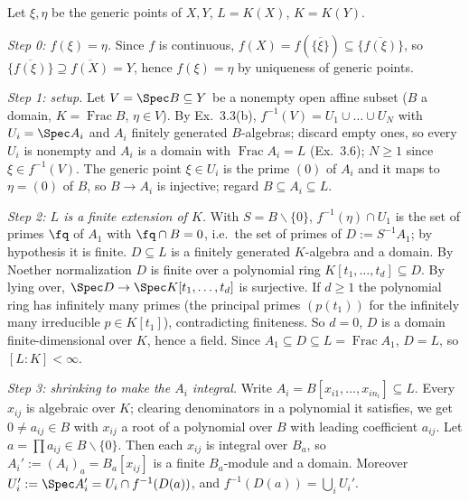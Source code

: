 \documentclass[11pt]{article}
\begin{document}
\pf
Let $\xi,\eta$ be the generic points of $X,Y$, $L=K(X)$, $K=K(Y)$.

\emph{Step 0: $f(\xi)=\eta$.} Since $f$ is continuous, $f(X)=f(\overline{\{\xi\}})\subseteq\overline{\{f(\xi)\}}$, so $\overline{\{f(\xi)\}}\supseteq\overline{f(X)}=Y$, hence $f(\xi)=\eta$ by uniqueness of generic points.

\emph{Step 1: setup.} Let $V=\Spec B\subseteq Y$ be a nonempty open affine subset ($B$ a domain, $K=\operatorname{Frac}B$, $\eta\in V$). By Ex.~3.3(b), $f^{-1}(V)=U_1\cup\dots\cup U_N$ with $U_i=\Spec A_i$ and $A_i$ finitely generated $B$-algebras; discard empty ones, so every $U_i$ is nonempty and $A_i$ is a domain with $\operatorname{Frac}A_i=L$ (Ex.~3.6); $N\ge1$ since $\xi\in f^{-1}(V)$. The generic point $\xi\in U_i$ is the prime $(0)$ of $A_i$ and it maps to $\eta=(0)$ of $B$, so $B\to A_i$ is injective; regard $B\subseteq A_i\subseteq L$.

\emph{Step 2: $L$ is a finite extension of $K$.} With $S=B\smallsetminus\{0\}$, $f^{-1}(\eta)\cap U_1$ is the set of primes $\fq$ of $A_1$ with $\fq\cap B=0$, i.e.\ the set of primes of $D:=S^{-1}A_1$; by hypothesis it is finite. $D\subseteq L$ is a finitely generated $K$-algebra and a domain. By Noether normalization $D$ is finite over a polynomial ring $K[t_1,\dots,t_d]\subseteq D$. By lying over, $\Spec D\to\Spec K[t_1,\dots,t_d]$ is surjective. If $d\ge1$ the polynomial ring has infinitely many primes (the principal primes $(p(t_1))$ for the infinitely many irreducible $p\in K[t_1]$), contradicting finiteness. So $d=0$, $D$ is a domain finite-dimensional over $K$, hence a field. Since $A_1\subseteq D\subseteq L=\operatorname{Frac}A_1$, $D=L$, so $[L:K]<\infty$.

\emph{Step 3: shrinking to make the $A_i$ integral.} Write $A_i=B[x_{i1},\dots,x_{in_i}]\subseteq L$. Every $x_{ij}$ is algebraic over $K$; clearing denominators in a polynomial it satisfies, we get $0\ne a_{ij}\in B$ with $x_{ij}$ a root of a polynomial over $B$ with leading coefficient $a_{ij}$. Let $a=\prod a_{ij}\in B\smallsetminus\{0\}$. Then each $x_{ij}$ is integral over $B_a$, so $A_i':=(A_i)_a=B_a[x_{ij}]$ is a finite $B_a$-module and a domain. Moreover $U_i':=\Spec A_i'=U_i\cap f^{-1}(D(a))$, and $f^{-1}(D(a))=\bigcup_iU_i'$.
\end{document}
